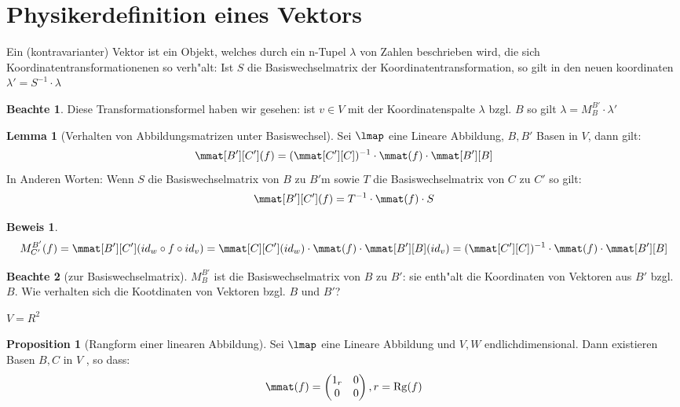 \documentclass[oneside,fontsize=11pt,paper=a4,BCOR=0mm,DIV=12,automark,headsepline]{scrbook}
\DeclareMathOperator{\mRg}{Rg}
\theoremstyle{remark}
\theoremstyle{definition}
\newtheorem*{notte}{Beachte}
\newtheorem*{proposition}{Proposition}
\newtheorem{lemma}{Lemma}[section]
\theoremstyle{definition}
\newtheorem*{prof}{Beweis}
\theoremstyle{remark}
\begin{document}
\section{Physikerdefinition eines Vektors}
\label{sec:phyv}

Ein (kontravarianter) Vektor ist ein Objekt, welches durch ein n-Tupel \(\lambda\)
von Zahlen beschrieben wird, die sich Koordinatentransformationenen so
verh"alt: Ist $S$ die Basiswechselmatrix der Koordinatentransformation, so gilt
in den neuen koordinaten $\lambda'=S^{-1}\cdot\lambda$

\begin{notte}
  Diese Transformationsformel haben wir gesehen: ist $v\in V$ mit der
  Koordinatenspalte $\lambda$ bzgl. $B$ so gilt
  $\lambda=M^{B'}_{B}\cdot \lambda ' $
\end{notte}

\begin{lemma}[Verhalten von Abbildungsmatrizen unter Basiswechsel]
  Sei $\lmap$ eine Lineare Abbildung, $B,B'$ Basen in $V$, dann gilt:
  \[
    \mmat[B'][C'](f)=(\mmat[C'][C])^{-1} \cdot \mmat(f) \cdot \mmat[B'][B]
  \] In Anderen Worten: Wenn $S$ die Basiswechselmatrix von $B$ zu $B'$m sowie $T$ die 
  Basiswechselmatrix von $C$ zu $C'$ so gilt:
   \[
  \mmat[B'][C'](f)=T^{-1}\cdot \mmat(f) \cdot S
  \]
\end{lemma}

\begin{prof}
  \[M^{B'}_{C'}(f)=\mmat[B'][C'](id_w \circ f \circ id_v)=\mmat[C][C'](id_w) \cdot \mmat(f) \cdot \mmat[B'][B](id_v)=(\mmat[C'][C])^{-1} \cdot \mmat(f) \cdot \mmat[B'][B]\]
\end{prof}

\begin{notte}[zur Basiswechselmatrix]
  $ M^{B'}_{B}$ ist die Basiswechselmatrix von $B$ zu $B'$: sie enth"alt die
  Koordinaten von Vektoren aus $B'$ bzgl. $B$. Wie verhalten sich die
  Kootdinaten von Vektoren bzgl. $B$ und $B'$?\\
\end{notte}

\begin{exa}
  $V=R^{2}$
\end{exa}

\begin{proposition}[Rangform einer linearen Abbildung]
  Sei $\lmap$  eine Lineare Abbildung und $V,W$ endlichdimensional. Dann existieren
  Basen $B, C$ in $V$ , so dass: 
  \[
  \mmat(f) = \begin{pmatrix}
	1_r & 0 \\
	0 & 0
  \end{pmatrix}, r = \mRg(f)
  \]
\end{proposition}
\end{document}
